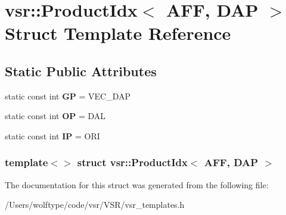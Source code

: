 \hypertarget{structvsr_1_1_product_idx_3_01_a_f_f_00_01_d_a_p_01_4}{\section{vsr\-:\-:Product\-Idx$<$ A\-F\-F, D\-A\-P $>$ Struct Template Reference}
\label{structvsr_1_1_product_idx_3_01_a_f_f_00_01_d_a_p_01_4}
}
\subsection*{Static Public Attributes}
\begin{DoxyCompactItemize}
\item 
\hypertarget{structvsr_1_1_product_idx_3_01_a_f_f_00_01_d_a_p_01_4_ad25bf52346df8d3b1b46b3bf0cbab940}{static const int {\bfseries G\-P} = V\-E\-C\-\_\-\-D\-A\-P}\label{structvsr_1_1_product_idx_3_01_a_f_f_00_01_d_a_p_01_4_ad25bf52346df8d3b1b46b3bf0cbab940}

\item 
\hypertarget{structvsr_1_1_product_idx_3_01_a_f_f_00_01_d_a_p_01_4_a71b05ddd8d6d29d738fdeb47b9bafe2d}{static const int {\bfseries O\-P} = D\-A\-L}\label{structvsr_1_1_product_idx_3_01_a_f_f_00_01_d_a_p_01_4_a71b05ddd8d6d29d738fdeb47b9bafe2d}

\item 
\hypertarget{structvsr_1_1_product_idx_3_01_a_f_f_00_01_d_a_p_01_4_a98a10a6aab02cb017df50188c26b7795}{static const int {\bfseries I\-P} = O\-R\-I}\label{structvsr_1_1_product_idx_3_01_a_f_f_00_01_d_a_p_01_4_a98a10a6aab02cb017df50188c26b7795}

\end{DoxyCompactItemize}
\subsubsection*{template$<$$>$ struct vsr\-::\-Product\-Idx$<$ A\-F\-F, D\-A\-P $>$}



The documentation for this struct was generated from the following file\-:\begin{DoxyCompactItemize}
\item 
/\-Users/wolftype/code/vsr/\-V\-S\-R/vsr\-\_\-templates.\-h\end{DoxyCompactItemize}
